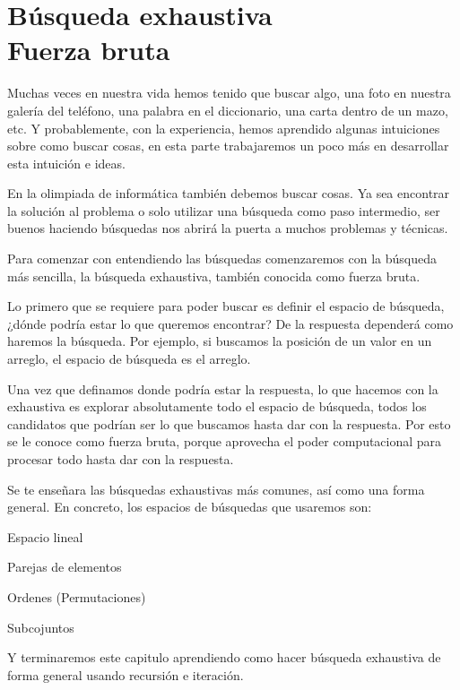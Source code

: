 \chapter[Búsqueda Exhaustiva]{Búsqueda exhaustiva\\ Fuerza bruta}
Muchas veces en nuestra vida hemos tenido que buscar algo, una foto en nuestra galería del teléfono, una palabra en el diccionario, una carta dentro de un mazo, etc. Y probablemente, con la experiencia, hemos aprendido algunas intuiciones sobre como buscar cosas, en esta parte trabajaremos un poco más en desarrollar esta intuición e ideas.

En la olimpiada de informática también debemos buscar cosas. Ya sea encontrar la solución al problema o solo utilizar una búsqueda como paso intermedio, ser buenos haciendo búsquedas nos abrirá la puerta a muchos problemas y técnicas.

Para comenzar con entendiendo las búsquedas comenzaremos con la búsqueda más sencilla, la búsqueda exhaustiva, también conocida como fuerza bruta. 

Lo primero que se requiere para poder buscar es definir el espacio de búsqueda, ¿dónde podría estar lo que queremos encontrar? De la respuesta dependerá como haremos la búsqueda. Por ejemplo, si buscamos la posición de un valor en un arreglo, el espacio de búsqueda es el arreglo.

Una vez que definamos donde podría estar la respuesta, lo que hacemos con la exhaustiva es explorar absolutamente todo el espacio de búsqueda, todos los candidatos que podrían ser lo que buscamos hasta dar con la respuesta. Por esto se le conoce como fuerza bruta, porque aprovecha el poder computacional para procesar todo hasta dar con la respuesta.

Se te enseñara las búsquedas exhaustivas más comunes, así como una forma general. En concreto, los espacios de búsquedas que usaremos son:

\begin{plimits}
	\item Espacio lineal
	\item Parejas de elementos
	\item Ordenes (Permutaciones)
	\item Subcojuntos
\end{plimits}
 
 Y terminaremos este capitulo aprendiendo como hacer búsqueda exhaustiva de forma general usando recursión e iteración.
 

 


